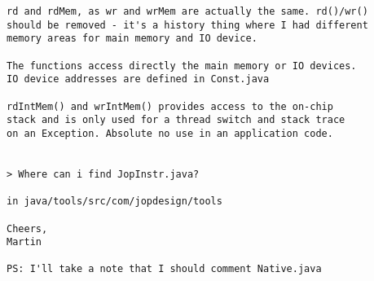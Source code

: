 \documentclass[a4paper,12pt]{scrartcl}
\begin{document}
\begin{verbatim}
rd and rdMem, as wr and wrMem are actually the same. rd()/wr()
should be removed - it's a history thing where I had different
memory areas for main memory and IO device.

The functions access directly the main memory or IO devices.
IO device addresses are defined in Const.java

rdIntMem() and wrIntMem() provides access to the on-chip
stack and is only used for a thread switch and stack trace
on an Exception. Absolute no use in an application code.


> Where can i find JopInstr.java?

in java/tools/src/com/jopdesign/tools

Cheers,
Martin

PS: I'll take a note that I should comment Native.java

\end{verbatim}
\end{document}
